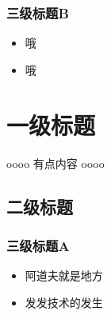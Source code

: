 \subsubsection{三级标题B}\label{ux4e09ux7ea7ux6807ux9898b}

\begin{itemize}
\tightlist
\item
  哦
\item
  哦
\end{itemize}

\section{一级标题}\label{ux4e00ux7ea7ux6807ux9898}

oooo 有点内容 oooo

\subsection{二级标题}\label{ux4e8cux7ea7ux6807ux9898}

\subsubsection{三级标题A}\label{ux4e09ux7ea7ux6807ux9898a-1}

\begin{itemize}
\tightlist
\item
  阿道夫就是地方
\item
  发发技术的发生
\end{itemize}
